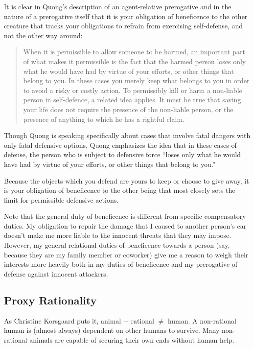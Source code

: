 		It is clear in Quong’s description of an agent-relative prerogative and
		in the nature of a prerogative itself that it is your obligation of
		beneficence to the other creature that tracks your obligations to
		refrain from exercising self-defense, and not the other way around:
		\begin{quote}
			When it is permissible to allow someone to be harmed,
			an important part of what makes it permissible is the fact that the
			harmed person loses only what he would have had by virtue of your
			efforts, or other things that belong to you. In these cases you
			merely keep what belongs to you in order to avoid a risky or costly
			action. To permissibly kill or harm a non-liable person in
			self-defence, a related idea applies. It must be true that saving
			your life does not require the presence of the non-liable person,
			or the presence of anything to which he has a rightful
			claim.\autocite[95--96]{quong}
		\end{quote}
		Though Quong is speaking specifically about cases that involve fatal
		dangers with only fatal defensive options, Quong emphasizes the idea
		that in these cases of defense, the person who is subject to defensive
		force “loses only what he would have had by virtue of your efforts, or
		other things that belong to you.”\autocite[95]{quong}

		Because the objects which you defend are yours to keep or choose to
		give away, it is your obligation of beneficence to the other being that
		most closely sets the limit for permissible defensive actions.

		Note that the general duty of beneficence is different from specific
		compensatory duties. My obligation to repair the damage that I caused
		to another person’s car doesn’t make me more liable to the innocent
		threats that they may impose. However, my general relational duties
		of beneficence towards a person (say, because they are my family member
		or coworker) give me a reason to weigh their interests more heavily both
		in my duties of beneficence and my prerogative of defense against
		innocent attackers.

    \subsection{Proxy Rationality}
		As Christine Korsgaard puts it, animal $+$ rational $\neq$ human.
		A non-rational human is (almost always) dependent on other humans
		to survive. Many non-rational animals are capable of securing their
		own ends without human help.

